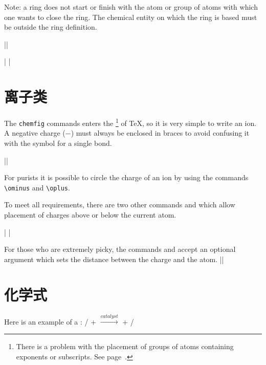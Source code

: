 \documentclass[10pt]{article}
\begin{document}
Note: a ring does not start or finish with the atom or group of atoms with which one wants to close the ring. The chemical entity on which the ring is based must be outside the ring definition.

||

|\hspace{1cm}
	|

\section{离子类}
The \verb|chemfig| commands enters the \footnote{There is a problem with the placement of groups of atoms containing exponents or subscripts. See page~\pageref{alignement.vertical}.} of \TeX, so it is very simple to write an ion. A negative charge ($-$) must always be enclosed in braces to avoid \CF confusing it with the symbol for a single bond.

||

For purists it is possible to circle the charge of an ion by using the commands \verb|\ominus| and \verb|\oplus|.

To meet all requirements, there are two other commands \idx{\chemabove} and \idx{\chembelow} which allow placement of charges above or below the current atom\idx*\lewis.

|
\hspace{1cm}
\vskip5pt
|

For those who are extremely picky, the commands \idx{\chemabove} and \idx{\chembelow} accept an optional argument which sets the distance between the charge and the atom\idx*\lewis.
||

\section{化学式}
Here is an example of a :
/ \hspace{.5cm} + \hspace{.5cm} 
\hspace{.5cm} $\xrightarrow{catalyst}$ \hspace{.5cm} 
 \hspace{.5cm} + \hspace{.5cm} /
\end{document}
